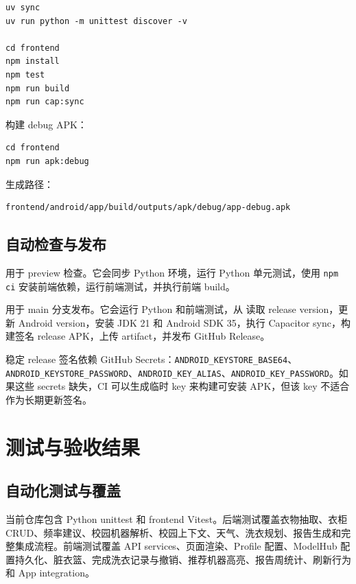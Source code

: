 \documentclass[11pt,a4paper]{ctexart}
\begin{document}
\begin{lstlisting}[style=command]
uv sync
uv run python -m unittest discover -v

cd frontend
npm install
npm test
npm run build
npm run cap:sync
\end{lstlisting}

构建 debug APK：

\begin{lstlisting}[style=command]
cd frontend
npm run apk:debug
\end{lstlisting}

生成路径：

\begin{lstlisting}[style=command]
frontend/android/app/build/outputs/apk/debug/app-debug.apk
\end{lstlisting}

\subsection{自动检查与发布}

 用于 preview 检查。它会同步 Python 环境，运行 Python 单元测试，使用 \texttt{npm ci} 安装前端依赖，运行前端测试，并执行前端 build。

 用于 main 分支发布。它会运行 Python 和前端测试，从  读取 release version，更新 Android version，安装 JDK 21 和 Android SDK 35，执行 Capacitor sync，构建签名 release APK，上传 artifact，并发布 GitHub Release。

稳定 release 签名依赖 GitHub Secrets：\texttt{ANDROID\_KEYSTORE\_BASE64}、\texttt{ANDROID\_KEYSTORE\_PASSWORD}、\texttt{ANDROID\_KEY\_ALIAS}、\texttt{ANDROID\_KEY\_PASSWORD}。如果这些 secrets 缺失，CI 可以生成临时 key 来构建可安装 APK，但该 key 不适合作为长期更新签名。

\section{测试与验收结果}

\subsection{自动化测试与覆盖}

当前仓库包含 Python unittest 和 frontend Vitest。后端测试覆盖衣物抽取、衣柜 CRUD、频率建议、校园机器解析、校园上下文、天气、洗衣规划、报告生成和完整集成流程。前端测试覆盖 API services、页面渲染、Profile 配置、ModelHub 配置持久化、脏衣篮、完成洗衣记录与撤销、推荐机器高亮、报告周统计、刷新行为和 App integration。
\end{document}
